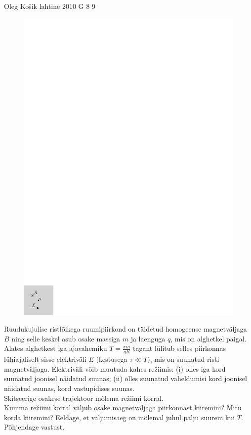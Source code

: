 \documentclass[11pt]{article}
\begin{document}
{%
{Oleg Košik} %
{lahtine} %
{2010} %
{G 8} %
{9} %
{
\ifStatement
\begin{figure}
	\vspace{-2.5ex}
	\includegraphics[width=\linewidth]{2010-lahg-08-laengu_joonis_ipe}
	\vspace{-6ex}
\end{figure}
Ruudukujulise ristlõikega ruumipiirkond on täidetud homogeense magnetväljaga
$B$ ning selle keskel asub osake massiga $m$ ja laenguga $q$, mis on alghetkel
paigal. Alates alghetkest iga ajavahemiku $T=\frac{\pi m}{qB}$ tagant lülitub
selles piirkonnas lühiajaliselt sisse elektriväli $E$ (kestusega $\tau \ll T$), mis
on suunatud risti magnetväljaga. Elektriväli võib muutuda kahes
režiimis: (i) olles iga kord suunatud joonisel näidatud suunas; (ii)
olles suunatud vaheldumisi kord joonisel näidatud suunas, kord vastupidises
suunas.\\
\osa Skitseerige osakese trajektoor mõlema režiimi korral.\\
\osa Kumma
režiimi korral väljub osake magnetväljaga piirkonnast kiiremini? Mitu korda
kiiremini?
Eeldage, et väljumisaeg on mõlemal juhul palju suurem kui $T$. Põhjendage vastust.
\fi
}

}
\end{document}
